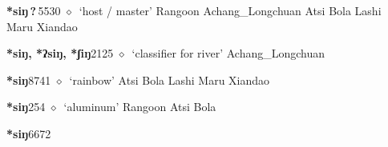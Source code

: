   \begin{list}{}{\leftmargin=1.5em \itemindent=-1.5em}
  \item {\footnotesize \textbf{*siŋ\,?\,}}{\tiny 5530}
         $\diamond$~`host / master'
         Rangoon 
\hspace{1ex}
         Achang\_Longchuan 
\hspace{1ex}
         Atsi 
\hspace{1ex}
         Bola 
\hspace{1ex}
         Lashi 
\hspace{1ex}
         Maru 
\hspace{1ex}
         Xiandao 
  \item {\footnotesize \textbf{*siŋ, *ʔsiŋ, *ʃiŋ}}{\tiny 2125}
\hspace{1ex}
         $\diamond$~`classifier for river'
         Achang\_Longchuan 
  \item {\footnotesize \textbf{*siŋ}}{\tiny 8741}
\hspace{1ex}
         $\diamond$~`rainbow'
         Atsi 
\hspace{1ex}
         Bola 
\hspace{1ex}
         Lashi 
\hspace{1ex}
         Maru 
\hspace{1ex}
         Xiandao 
  \item {\footnotesize \textbf{*siŋ}}{\tiny 254}
\hspace{1ex}
         $\diamond$~`aluminum'
         Rangoon 
\hspace{1ex}
         Atsi 
\hspace{1ex}
         Bola 
  \item {\footnotesize \textbf{*siŋ}}{\tiny 6672}

\end{list}
